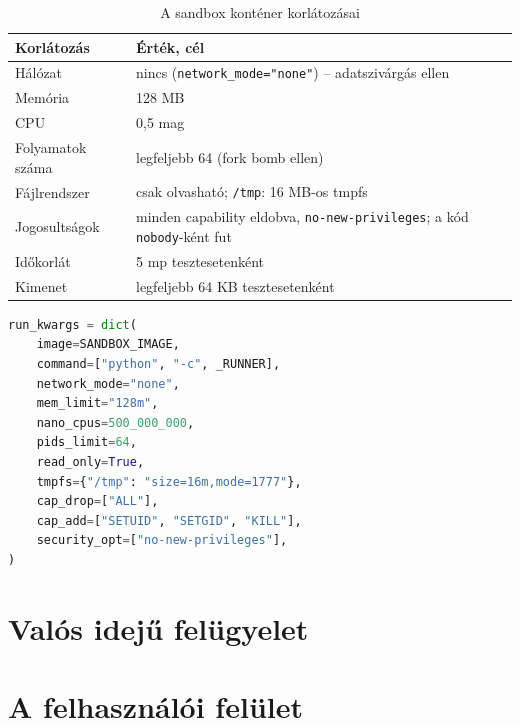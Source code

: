 \begin{table}[H]
  \centering
  \caption{A sandbox konténer korlátozásai}
  \label{tab:sandbox}
  \begin{tabularx}{\textwidth}{@{}lX@{}}
    \toprule
    Korlátozás & Érték, cél \\
    \midrule
    Hálózat             & nincs (\texttt{network\_mode="none"}) – adatszivárgás ellen \\
    Memória             & 128 MB \\
    CPU                 & 0,5 mag \\
    Folyamatok száma    & legfeljebb 64 (fork bomb ellen) \\
    Fájlrendszer        & csak olvasható; \texttt{/tmp}: 16 MB-os tmpfs \\
    Jogosultságok       & minden capability eldobva, \texttt{no-new-privileges}; a kód \texttt{nobody}-ként fut \\
    Időkorlát           & 5 mp tesztesetenként \\
    Kimenet             & legfeljebb 64 KB tesztesetenként \\
    \bottomrule
  \end{tabularx}
\end{table}

\begin{lstlisting}[language=Python,caption={A sandbox konténer indítási paraméterei (\texttt{sandbox.py}, részlet)},label={lst:sandbox}]
run_kwargs = dict(
    image=SANDBOX_IMAGE,
    command=["python", "-c", _RUNNER],
    network_mode="none",
    mem_limit="128m",
    nano_cpus=500_000_000,
    pids_limit=64,
    read_only=True,
    tmpfs={"/tmp": "size=16m,mode=1777"},
    cap_drop=["ALL"],
    cap_add=["SETUID", "SETGID", "KILL"],
    security_opt=["no-new-privileges"],
)
\end{lstlisting}

\section{Valós idejű felügyelet}

\section{A felhasználói felület}
